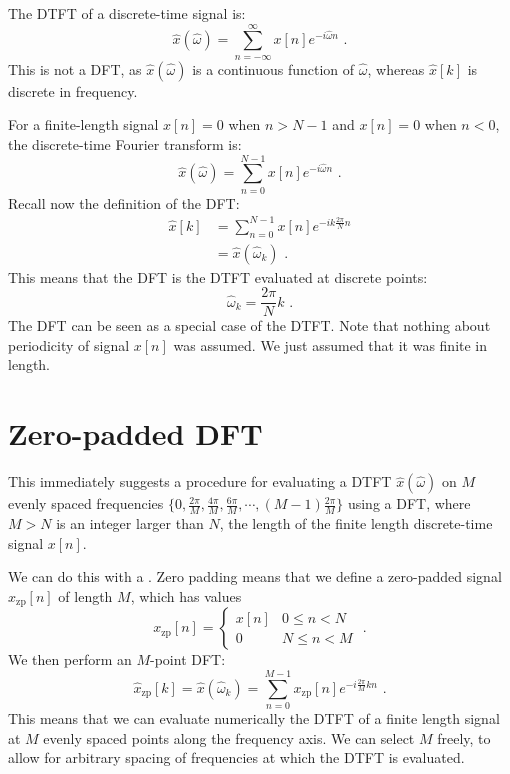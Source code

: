 The DTFT of a discrete-time signal is:
\begin{equation}
\hat{x}(\hat{\omega}) = \sum_{n=-\infty}^{\infty} x[n] e^{-i\hat{\omega}n} \,\,.
\end{equation}
This is not a DFT, as $\hat{x}(\hat{\omega})$ is a continuous function
of $\hat{\omega}$, whereas $\hat{x}[k]$ is discrete in frequency.  

For a finite-length signal $x[n] = 0$ when $n>N-1$ and $x[n] = 0$ when
$n<0$, the discrete-time Fourier transform is:
\begin{equation}
\hat{x}(\hat{\omega}) = \sum_{n=0}^{N-1} x[n] e^{-i\hat{\omega}n} \,\,.
\end{equation}
Recall now the definition of the DFT:
\begin{align}
\hat{x}[k] & = \sum_{n=0}^{N-1} x[n] e^{-ik\frac{2\pi}{N}n}\\
   & = \hat{x}(\hat{\omega}_k) \,\,.
\end{align}
This means that the DFT is the DTFT evaluated at discrete points:
\begin{equation}
\boxed{
\hat{\omega}_k=\frac{2\pi}{N}k
} \,\,.
\end{equation}
The DFT can be seen as a special case of the DTFT. Note that nothing
about periodicity of signal $x[n]$ was assumed. We just assumed that
it was finite in length.

\section{Zero-padded DFT}

This immediately suggests a procedure for evaluating a DTFT
$\hat{x}(\hat{\omega})$ on $M$ evenly spaced frequencies
$\{0,\frac{2\pi}{M},\frac{4\pi}{M},\frac{6\pi}{M},\cdots,(M-1)\frac{2\pi}{M}\}$ using a DFT, where
$M>N$ is an integer larger than $N$, the length of the finite length
discrete-time signal $x[n]$.

We can do this with a . Zero padding means that we
define a zero-padded signal $x_{\mathrm{zp}}[n]$ of length $M$, which
has values
\begin{equation}
x_{\mathrm{zp}}[n]=\left\{ \begin{array}{cc}
x[n] & 0 \le n < N\\
0 & N \le n < M
\end{array}\right. \,\,.
\end{equation}
We then perform an $M$-point DFT:
\begin{equation}
  \boxed{
    \hat{x}_{\mathrm{zp}}[k] = \hat{x}(\hat{\omega}_k) = \sum_{n=0}^{M-1}x_{\mathrm{zp}}[n]e^{-i\frac{2\pi}{M}kn}
    } \,\,.
\end{equation}
This means that we can evaluate numerically the DTFT of a finite
length signal at $M$ evenly spaced points along the frequency axis. We
can select $M$ freely, to allow for arbitrary spacing of frequencies
at which the DTFT is evaluated.

